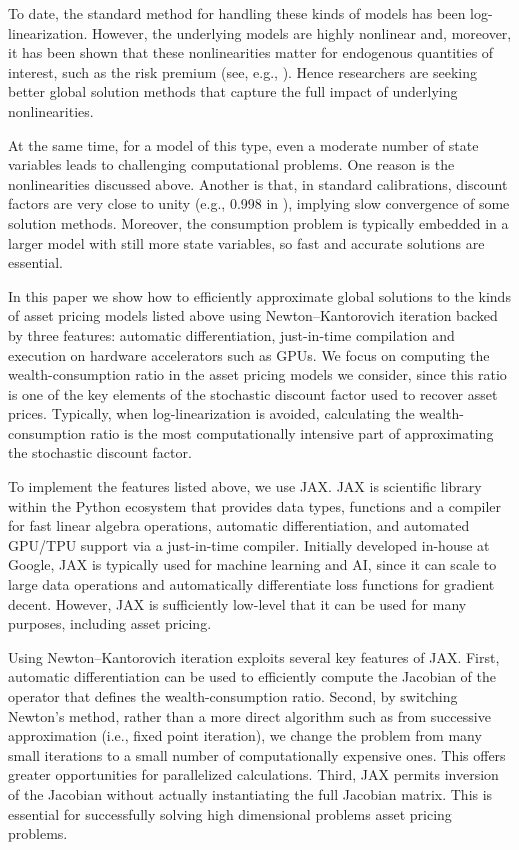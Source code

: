 \documentclass[12pt, reqno]{amsart}
\newcommand{\1}{\mathbbm 1}
\theoremstyle{plain}
\theoremstyle{definition}
\begin{document}
To date, the standard method for handling these kinds of models has been
log-linearization.  However, the underlying models are highly nonlinear and,
moreover, it has been shown that these nonlinearities matter for endogenous
quantities of interest, such as the risk premium (see, e.g.,
\cite{pohl2018higher}).  Hence researchers are seeking better global solution
methods that capture the full impact of underlying nonlinearities.

At the same time, for a model of this type, even a moderate number of state
variables leads to challenging computational problems.  One reason is the
nonlinearities discussed above.  Another is that, in standard calibrations,
discount factors are very close to unity (e.g., 0.998 in
\cite{bansal2004risks}), implying slow convergence of some solution methods.
Moreover, the consumption problem is typically embedded in a larger model with
still more state variables, so fast and accurate solutions are essential.  

In this paper we show how to efficiently approximate global solutions to the
kinds of asset pricing models listed above using Newton--Kantorovich iteration
backed by three features: automatic differentiation, just-in-time compilation
and execution on hardware accelerators such as GPUs. We focus on computing the
wealth-consumption ratio in the asset pricing models we consider, since this
ratio is one of the key elements of the stochastic discount factor used to
recover asset prices.  Typically, when log-linearization is avoided, calculating
the wealth-consumption ratio is the most computationally intensive part of
approximating the stochastic discount factor.

To implement the features listed above, we use JAX. JAX is
scientific library within the Python ecosystem that provides data types,
functions and a compiler for fast linear algebra operations, automatic
differentiation, and automated GPU/TPU support via a just-in-time compiler.
Initially developed in-house at Google,
JAX is typically used for machine learning and AI, since it can scale to large
data operations and automatically differentiate loss functions for gradient
decent. However, JAX is sufficiently low-level that it can be used for many
purposes, including asset pricing.

Using Newton--Kantorovich iteration exploits several key features of JAX. First,
automatic differentiation can be used to efficiently compute the Jacobian of the
operator that defines the wealth-consumption ratio. Second, by switching
Newton's method, rather than a more direct algorithm such as from successive
approximation (i.e., fixed point iteration), we change the problem from many
small iterations to a small number of computationally expensive ones. This
offers greater opportunities for parallelized calculations. Third, JAX permits
inversion of the Jacobian without actually instantiating the full Jacobian
matrix.   This is essential for successfully solving high dimensional problems
asset pricing problems.
\end{document}
